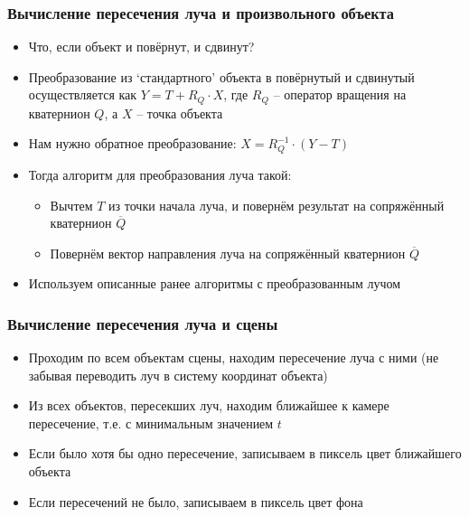 \documentclass[10pt]{beamer}
\begin{document}
\begin{frame}
\frametitle{Вычисление пересечения луча и произвольного объекта}
\begin{itemize}
\item Что, если объект и повёрнут, и сдвинут?
\pause
\item Преобразование из `стандартного' объекта в повёрнутый и сдвинутый осуществляется как \begin{math}Y = T + R_Q\cdot X\end{math}, где \begin{math}R_Q\end{math} -- оператор вращения на кватернион \begin{math}Q\end{math}, а \begin{math}X\end{math} -- точка объекта
\pause
\item Нам нужно обратное преобразование: \begin{math}X = R_Q^{-1} \cdot (Y - T)\end{math}
\pause
\item Тогда алгоритм для преобразования луча такой:
\pause
\begin{itemize}
\item Вычтем \begin{math}T\end{math} из точки начала луча, и повернём результат на сопряжённый кватернион \begin{math}\overline{Q}\end{math}
\pause
\item Повернём вектор направления луча на сопряжённый кватернион \begin{math}\overline{Q}\end{math}
\end{itemize}
\pause
\item Используем описанные ранее алгоритмы с преобразованным лучом
\end{itemize}
\end{frame}

\begin{frame}
\frametitle{Вычисление пересечения луча и сцены}
\begin{itemize}
\item Проходим по всем объектам сцены, находим пересечение луча с ними (не забывая переводить луч в систему координат объекта)
\pause
\item Из всех объектов, пересекших луч, находим ближайшее к камере пересечение, т.е. с минимальным значением \begin{math}t\end{math}
\pause
\item Если было хотя бы одно пересечение, записываем в пиксель цвет ближайшего объекта
\pause
\item Если пересечений не было, записываем в пиксель цвет фона
\end{itemize}
\end{frame}
\end{document}
